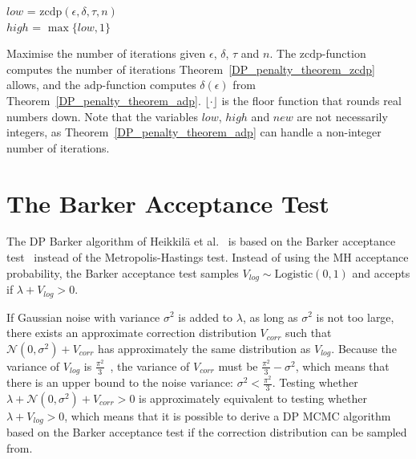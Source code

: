 \documentclass[english,twoside,openright]{HYgraduMLDS}
\newcommand{\caln}{{\mathcal{N}}}
\begin{document}
\begin{algorithm}[H]\label{max_iterations_algo}
  \SetAlgoLined
	\(low\) = \(\mathrm{zcdp}(\epsilon, \delta, \tau, n)\) \\
  \(high\) = \(\max \{low, 1\}\) \\


  \caption{
    Maximise the number of iterations given \(\epsilon\), \(\delta\),
    \(\tau\) and \(n\). The
    \(\mathrm{zcdp}\)-function computes the number of iterations
    Theorem~\ref{DP_penalty_theorem_zcdp} allows, and the
    \(\mathrm{adp}\)-function computes \(\delta(\epsilon)\) from
    Theorem~\ref{DP_penalty_theorem_adp}. \(\lfloor \cdot \rfloor\) is the
    floor function that rounds real numbers down. Note that the variables
    \(low\), \(high\) and \(new\) are not necessarily integers, as
    Theorem~\ref{DP_penalty_theorem_adp} can handle a non-integer number of
    iterations.
  }
\end{algorithm}

\section{The Barker Acceptance Test}\label{dp_barker_section}

The DP Barker algorithm of Heikkilä et al.~\cite{HeikkilaJDH19} is based on
the Barker acceptance test~\cite{Barker65} instead of the Metropolis-Hastings test.
Instead of using the MH acceptance probability, the Barker acceptance test samples 
\(V_{log}\sim \mathrm{Logistic(0, 1)}\) and accepts if \(\lambda + V_{log} > 0\).

If Gaussian noise with variance \(\sigma^2\) is added to 
\(\lambda\), as long as \(\sigma^{2}\) is not too large, there exists an
approximate correction
distribution \(V_{corr}\) such that \(\caln(0, \sigma^2) + V_{corr}\) has
approximately the same distribution as \(V_{log}\). Because the variance of
\(V_{log}\) is
\(\frac{\pi^2}{3}\)~\cite{HeikkilaJDH19}, the variance of \(V_{corr}\) must be 
\(\frac{\pi^2}{3} - \sigma^2\), which means that there is an upper bound
to the noise variance: \(\sigma^2 < \frac{\pi^2}{3}\). Testing whether 
\(\lambda + \caln(0, \sigma^2) + V_{corr} > 0\) is approximately equivalent
to testing 
whether \(\lambda + V_{log} > 0\), which means that it is possible to derive 
a DP MCMC algorithm based on the Barker acceptance test if the correction 
distribution can be sampled from.
\end{document}
